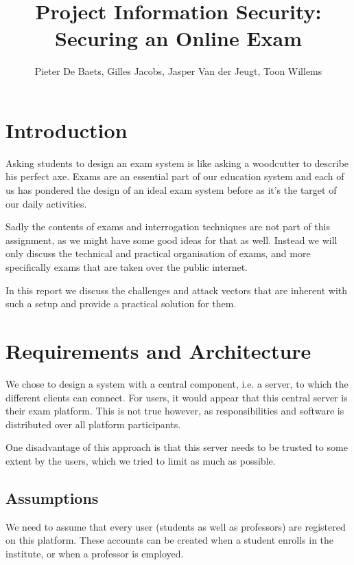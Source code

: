 \documentclass{article}
\title{Project Information Security: \\ \textbf{Securing an Online Exam}}
\author{Pieter De Baets, Gilles Jacobs, Jasper Van der Jeugt, Toon Willems}
\begin{document}
\makeatletter
\renewcommand\tableofcontents{}
\makeatother

\maketitle
\tableofcontents

\newpage

\section{Introduction}
\label{sec:introduction}

Asking students to design an exam system is like asking a woodcutter to describe
his perfect axe. Exams are an essential part of our education system and each of
us has pondered the design of an ideal exam system before as it's the target of
our daily activities.

Sadly the contents of exams and interrogation techniques are not part of this
assignment, as we might have some good ideas for that as well. Instead we will
only discuss the technical and practical organisation of exams, and more
specifically exams that are taken over the public internet.

In this report we discuss the challenges and attack vectors that are inherent
with such a setup and provide a practical solution for them.

\section{Requirements and Architecture}
\label{sec:requirements}

We chose to design a system with a central component, i.e. a server, to which
the different clients can connect. For users, it would appear that this central
server is their exam platform. This is not true however, as responsibilities and
software is distributed over all platform participants.

One disadvantage of this approach is that this server needs to be trusted to
some extent by the users, which we tried to limit as much as possible.

\subsection{Assumptions}
\label{subsec:req-assumptions}

We need to assume that every user (students as well as professors) are
registered on this platform. These accounts can be created when a student
enrolls in the institute, or when a professor is employed.
\end{document}
